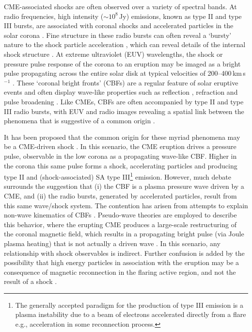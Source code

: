 

CME-associated shocks are often observed over a variety of spectral bands. At radio frequencies, high intensity ($\sim$$10^8$\,Jy) emissions, known as type II and type III bursts, are associated with coronal shocks and accelerated particles in the solar corona \citep{wild1950, mann1996}. Fine structure in these radio bursts can often reveal a \textquoteleft bursty' nature to the shock particle acceleration \citep{mann2005}, which can reveal details of the internal shock structure \citep{zlobec1993, guo2010}.
At extreme ultraviolet (EUV) wavelengths, the shock or pressure pulse response of the corona to an eruption may be imaged as a bright pulse propagating across the entire solar disk at typical velocities of 200--400\,km\,s$^{-1}$ \citep{gallagher2011}. These \textquoteleft coronal bright fronts' (CBFs) are a regular feature of solar eruptive events and often display wave-like properties such as reflection \citep{gopal2009}, refraction \citep{wang2000} and pulse broadening \citep{long2011}. %
Like CMEs, CBFs are often accompanied by type II and type III radio bursts, with EUV and radio images revealing a spatial link between the phenomena that is suggestive of a common origin \citep{maia2004, kozarev2011, vrsna2005}.


It has been proposed that the common origin for these myriad phenomena may be a CME-driven shock \citep{grechnev2011, warmuth2004b}.  In this scenario, the CME eruption drives a pressure pulse, observable in the low corona as a propagating wave-like CBF. Higher in the corona this same pulse forms a shock, accelerating particles and producing type II and {\color{blue}(shock-associated) SA type III}\footnote{{\color{blue}The generally accepted paradigm for the production of type III emission is a plasma instability due to a beam of electrons accelerated directly from a flare e.g., acceleration in some reconnection process.}} emission. However, much debate surrounds the suggestion that (i) the CBF is a plasma pressure wave driven by a CME, and (ii) the radio bursts, generated by accelerated particles, result from this same wave/shock system. The contention has arisen from attempts to explain non-wave kinematics of CBFs \citep{zhukov2009}. Pseudo-wave theories are employed to describe this behavior, where the erupting CME produces a large-scale restructuring of the coronal magnetic field, which results in a propagating bright pulse (via Joule plasma heating) that is not actually a driven wave \citep{delannee2008}. In this scenario, any relationship with shock observables is indirect. Further confusion is added by the possibility that high energy particles in association with the eruption may be a consequence of magnetic reconnection in the flaring active region, and not the result of a shock \citep{kahler2007}.

